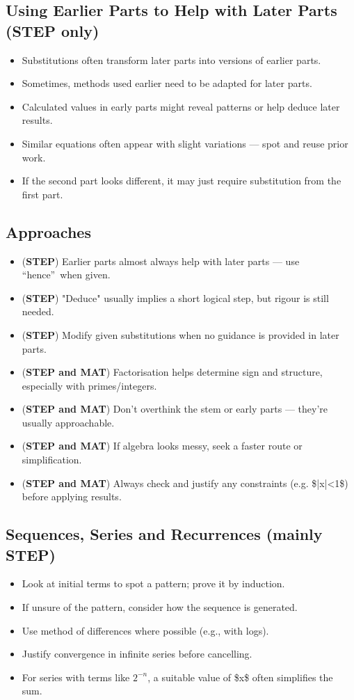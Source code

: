 \documentclass[11pt]{article}
\begin{document}
\subsection{Using Earlier Parts to Help with Later Parts (STEP only)}
\begin{itemize}
\item Substitutions often transform later parts into versions of earlier parts.
\item Sometimes, methods used earlier need to be adapted for later parts.
\item Calculated values in early parts might reveal patterns or help deduce later results.
\item Similar equations often appear with slight variations --- spot and reuse prior work.
\item If the second part looks different, it may just require substitution from the first part.
\end{itemize}

\subsection{Approaches}
\begin{itemize}
\item (\textbf{STEP}) Earlier parts almost always help with later parts --- use \textquotedblleft hence\textquotedblright\ when given.
\item (\textbf{STEP}) "Deduce" usually implies a short logical step, but rigour is still needed.
\item (\textbf{STEP}) Modify given substitutions when no guidance is provided in later parts.
\item (\textbf{STEP and MAT}) Factorisation helps determine sign and structure, especially with primes/integers.
\item (\textbf{STEP and MAT}) Don't overthink the stem or early parts --- they're usually approachable.
\item (\textbf{STEP and MAT}) If algebra looks messy, seek a faster route or simplification.
\item (\textbf{STEP and MAT}) Always check and justify any constraints (e.g. \$|x|<1\$) before applying results.
\end{itemize}

\subsection{Sequences, Series and Recurrences (mainly STEP)}
\begin{itemize}
\item Look at initial terms to spot a pattern; prove it by induction.
\item If unsure of the pattern, consider how the sequence is generated.
\item Use method of differences where possible (e.g., with logs).
\item Justify convergence in infinite series before cancelling.
\item For series with terms like $2^{-n}$, a suitable value of \$x\$ often simplifies the sum.
\end{itemize}
\end{document}
